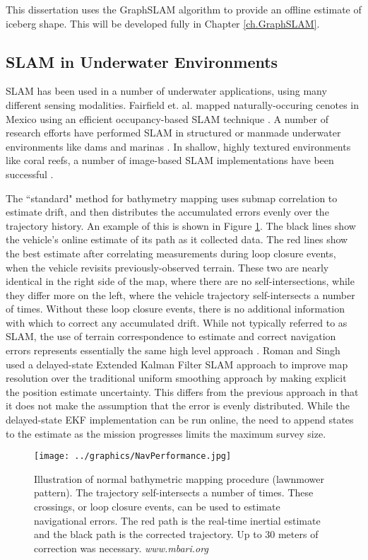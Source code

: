 This dissertation uses the GraphSLAM algorithm \cite{Thrun2006} to provide an offline estimate of iceberg shape. This will be developed fully in Chapter \ref{ch.GraphSLAM}. 

\subsection{SLAM in Underwater Environments}

SLAM has been used in a number of underwater applications, using many different sensing modalities. Fairfield et. al. mapped naturally-occuring cenotes in Mexico using an efficient occupancy-based SLAM technique \cite{Fairfield2007}. A number of research efforts have performed SLAM in structured or manmade underwater environments like dams and marinas \cite{Ribas2008}. In shallow, highly textured environments like coral reefs, a number of image-based SLAM implementations have been successful \cite{Eustice2005}.

The ``standard" method for bathymetry mapping uses submap correlation to estimate drift, and then distributes the accumulated errors evenly over the trajectory history. An example of this is shown in Figure \ref{fig:BathyMapping}. The black lines show the vehicle's online estimate of its path as it collected data. The red lines show the best estimate after correlating measurements during loop closure events, when the vehicle revisits previously-observed terrain. These two are nearly identical in the right side of the map, where there are no self-intersections, while they differ more on the left, where the vehicle trajectory self-intersects a number of times. Without these loop closure events, there is no additional information with which to correct any accumulated drift. While not typically referred to as SLAM, the use of terrain correspondence to estimate and correct navigation errors represents essentially the same high level approach \cite{Henthorn2006}.  Roman and Singh used a delayed-state Extended Kalman Filter SLAM approach to improve map resolution over the traditional uniform smoothing approach by making explicit the position estimate uncertainty\cite{Roman2005}. This differs from the previous approach in that it does not make the assumption that the error is evenly distributed. While the delayed-state EKF implementation can be run online, the need to append states to the estimate as the mission progresses limits the maximum survey size.

 \begin{figure}[!htb]
   \centering
   \texttt{[image: ../graphics/NavPerformance.jpg]} %
   \caption{Illustration of normal bathymetric mapping procedure (lawnmower pattern). The trajectory self-intersects a number of times. These crossings, or loop closure events, can be used to estimate navigational errors. The red path is the real-time inertial estimate and the black path is the corrected trajectory. Up to 30 meters of correction was necessary. \emph{www.mbari.org} }
   \label{fig:BathyMapping}
\end{figure}


